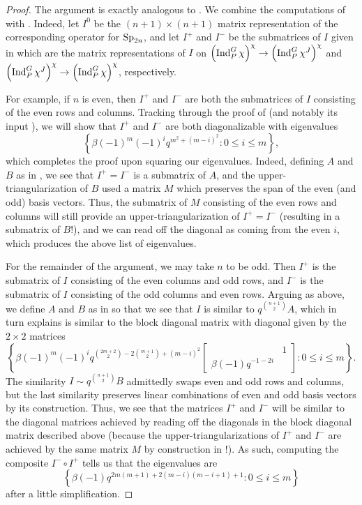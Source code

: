 \begin{proof}
    The argument is exactly analogous to . We combine the computations of  with . Indeed, let $I^0$ be the $(n+1)\times(n+1)$ matrix representation of the corresponding operator for $\mathrm{Sp}_{2n}$, and let $I^+$ and $I^-$ be the submatrices of $I$ given in  which are the matrix representations of $I$ on $\left(\operatorname{Ind}_P^G\chi\right)^\chi\to\left(\operatorname{Ind}_P^G\chi^J\right)^\chi$ and $\left(\operatorname{Ind}_P^G\chi^J\right)^\chi\to\left(\operatorname{Ind}_P^G\chi\right)^\chi$, respectively.

    For example, if $n$ is even, then $I^+$ and $I^-$ are both the submatrices of $I$ consisting of the even rows and columns. Tracking through the proof of  (and notably its input ), we will show that $I^+$ and $I^-$ are both diagonalizable with eigenvalues
    \[\left\{\beta(-1)^m(-1)^iq^{m^2+(m-i)^2}:0\le i\le m\right\},\]
    which completes the proof upon squaring our eigenvalues. Indeed, defining $A$ and $B$ as in , we see that $I^+=I^-$ is a submatrix of $A$, and the upper-triangularization of $B$ used a matrix $M$ which preserves the span of the even (and odd) basis vectors. Thus, the submatrix of $M$ consisting of the even rows and columns will still provide an upper-triangularization of $I^+=I^-$ (resulting in a submatrix of $B$!), and we can read off the diagonal as coming from the even $i$, which produces the above list of eigenvalues.

    For the remainder of the argument, we may take $n$ to be odd. Then $I^+$ is the submatrix of $I$ consisting of the even columns and odd rows, and $I^-$ is the submatrix of $I$ consisting of the odd columns and even rows. Arguing as above, we define $A$ and $B$ as in  so that we see that $I$ is similar to $q^{\binom{n+1}2}A$, which in turn  explains is similar to the block diagonal matrix with diagonal given by the $2\times2$ matrices
    \[\left\{\beta(-1)^m(-1)^iq^{\binom{2m+2}2-2\binom{m+1}2+(m-i)^2}\begin{bmatrix}
        & 1 \\
        \beta(-1)q^{-1-2i}
    \end{bmatrix}:0\le i\le m\right\}.\]
    The similarity $I\sim q^{\binom{n+1}2}B$ admittedly swaps even and odd rows and columns, but the last similarity preserves linear combinations of even and odd basis vectors by its construction. Thus, we see that the matrices $I^+$ and $I^-$ will be similar to the diagonal matrices achieved by reading off the diagonals in the block diagonal matrix described above (because the upper-triangularizations of $I^+$ and $I^-$ are achieved by the same matrix $M$ by construction in !). As such, computing the composite $I^-\circ I^+$ tells us that the eigenvalues are
    \[\left\{\beta(-1)q^{2m(m+1)+2(m-i)(m-i+1)+1}:0\le i\le m\right\}\]
    after a little simplification.
\end{proof}